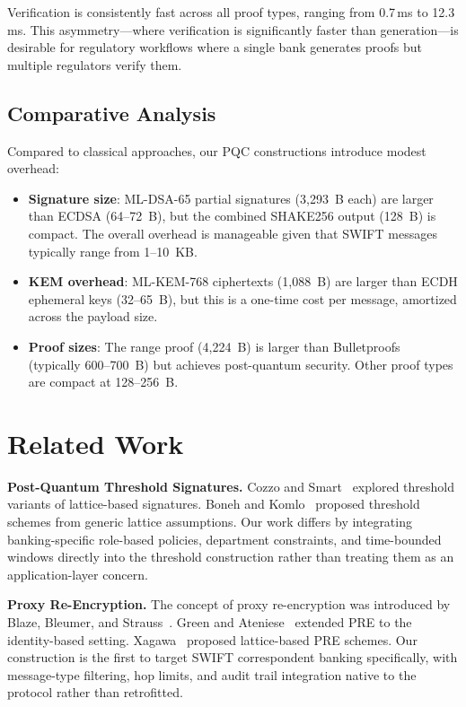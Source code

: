 \documentclass[conference,10pt]{IEEEtran}
\begin{document}
Verification is consistently fast across all proof types, ranging from 0.7\,ms to 12.3\,ms. This asymmetry---where verification is significantly faster than generation---is desirable for regulatory workflows where a single bank generates proofs but multiple regulators verify them.

\subsection{Comparative Analysis}

Compared to classical approaches, our PQC constructions introduce modest overhead:
\begin{itemize}[leftmargin=*]
\item \textbf{Signature size}: ML-DSA-65 partial signatures (3,293~B each) are larger than ECDSA (64--72~B), but the combined SHAKE256 output (128~B) is compact. The overall overhead is manageable given that SWIFT messages typically range from 1--10~KB.
\item \textbf{KEM overhead}: ML-KEM-768 ciphertexts (1,088~B) are larger than ECDH ephemeral keys (32--65~B), but this is a one-time cost per message, amortized across the payload size.
\item \textbf{Proof sizes}: The range proof (4,224~B) is larger than Bulletproofs~\cite{bunz2018bulletproofs} (typically 600--700~B) but achieves post-quantum security. Other proof types are compact at 128--256~B.
\end{itemize}

\section{Related Work}

\textbf{Post-Quantum Threshold Signatures.} Cozzo and Smart~\cite{cryptoeprint2023pqthreshold} explored threshold variants of lattice-based signatures. Boneh and Komlo~\cite{boneh2018threshold} proposed threshold schemes from generic lattice assumptions. Our work differs by integrating banking-specific role-based policies, department constraints, and time-bounded windows directly into the threshold construction rather than treating them as an application-layer concern.

\textbf{Proxy Re-Encryption.} The concept of proxy re-encryption was introduced by Blaze, Bleumer, and Strauss~\cite{blaze1998divertible}. Green and Ateniese~\cite{green2007identity} extended PRE to the identity-based setting. Xagawa~\cite{xagawa2019lattice} proposed lattice-based PRE schemes. Our construction is the first to target SWIFT correspondent banking specifically, with message-type filtering, hop limits, and audit trail integration native to the protocol rather than retrofitted.
\end{document}
